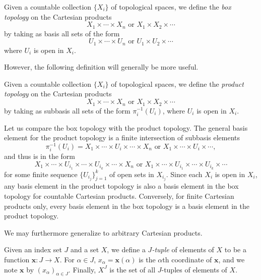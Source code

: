 \begin{definition}\label{2.41}
    Given a countable collection $\{X_i\}$ of topological spaces, we define the {\it box topology} on the Cartesian products
    $$X_1 \times \cdots \times X_n \text{ or } X_1 \times X_2 \times \cdots$$
    by taking as basis all sets of the form
    $$U_1 \times \cdots \times U_n \text{ or } U_1 \times U_2 \times \cdots$$
    where $U_i$ is open in $X_i$.
\end{definition}

However, the following definition will generally be more useful.
\begin{definition}\label{2.42}
    Given a countable collection $\{X_i\}$ of topological spaces, we define the {\it product topology} on the Cartesian products
    $$X_1 \times \cdots \times X_n \text{ or } X_1 \times X_2 \times \cdots$$
    by taking as subbasis all sets of the form $\pi_i^{-1}(U_i)$, where $U_i$ is open in $X_i$.
\end{definition}
Let us compare the box topology with the product topology. The general basis element for the product topology is a finite intersection of subbasis elements 
$$\pi_i^{-1}(U_i) = X_1 \times \cdots \times U_i \times \cdots \times X_n \text{ or } X_1 \times \cdots \times U_i \times \cdots,$$
and thus is in the form
$$X_1 \times \cdots \times U_{i_1} \times \cdots \times U_{i_k} \times \cdots \times X_n \text{ or } X_1 \times \cdots \times U_{i_1} \times \cdots \times U_{i_k} \times \cdots$$
for some finite sequence $\{U_{i_j}\}_{j=1}^k$ of open sets in $X_{i_j}$. Since each $X_i$ is open in $X_i$, any basis element in the product topology is also a basis element in the box topology for countable Cartesian products. Conversely, for finite Cartesian products only, every basis element in the box topology is a basis element in the product topology.

We may furthermore generalize to arbitrary Cartesian products.
\begin{definition}\label{2.43}
    Given an index set $J$ and a set $X$, we define a {\it $J$-tuple} of elements of $X$ to be a function $\mathbf{x}: J \rightarrow X$. For $\alpha \in J$, $x_\alpha = \mathbf{x}(\alpha)$ is the $\alpha$th coordinate of $\mathbf{x}$, and we note $\mathbf{x}$ by $(x_\alpha)_{\alpha \in J}$. Finally, $X^J$ is the set of all $J$-tuples of elements of $X$.
\end{definition}

